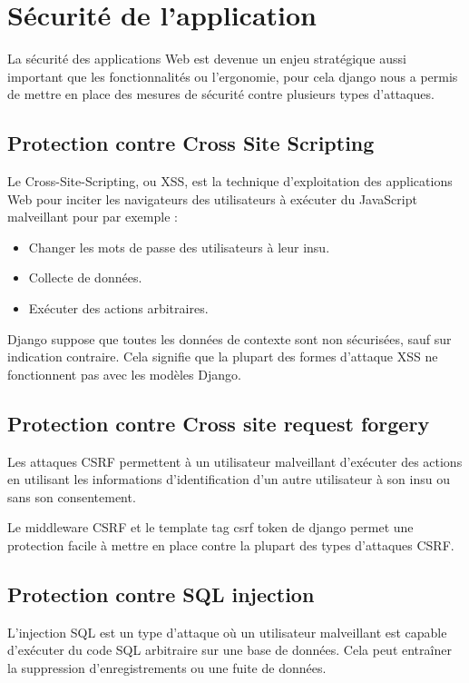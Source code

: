                 
\section{Sécurité de l’application}
        La sécurité des applications Web est devenue un enjeu stratégique aussi important que les fonctionnalités ou l’ergonomie, pour cela django nous a permis de mettre en place des mesures de sécurité contre plusieurs types d’attaques.
        \subsection{Protection contre Cross Site Scripting}
            Le Cross-Site-Scripting, ou XSS, est la technique d'exploitation des applications Web pour inciter les navigateurs des utilisateurs à exécuter du JavaScript malveillant pour par exemple :
                \begin{itemize}
                    \item[\textbullet] Changer les mots de passe des utilisateurs à leur insu.
                    \item[\textbullet] Collecte de données.
                    \item[\textbullet] Exécuter des actions arbitraires.
                \end{itemize}
            Django suppose que toutes les données de contexte sont non sécurisées, sauf sur indication contraire. Cela signifie que la plupart des formes d'attaque XSS ne fonctionnent pas avec les modèles Django.
            
    \subsection{Protection contre Cross site request forgery}
        Les attaques CSRF permettent à un utilisateur malveillant d'exécuter des actions en utilisant les informations d'identification d'un autre utilisateur à son insu ou sans son consentement.
        
        Le middleware CSRF et le template tag csrf token de django permet une protection facile à mettre en place contre la plupart des types d'attaques CSRF.
    
    \subsection{Protection contre SQL injection}
        L'injection SQL est un type d'attaque où un utilisateur malveillant est capable d'exécuter du code SQL arbitraire sur une base de données. Cela peut entraîner la suppression d'enregistrements ou une fuite de données.
        
